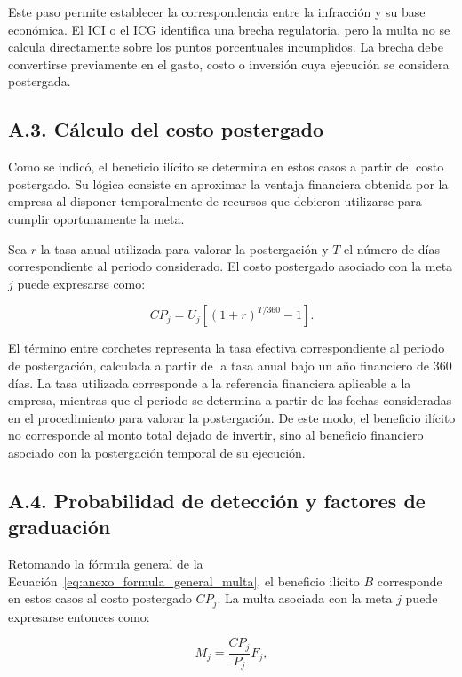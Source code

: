 Este paso permite establecer la correspondencia entre la infracción y su base económica. El ICI o el ICG identifica una brecha regulatoria, pero la multa no se calcula directamente sobre los puntos porcentuales incumplidos. La brecha debe convertirse previamente en el gasto, costo o inversión cuya ejecución se considera postergada.

\subsection*{A.3. Cálculo del costo postergado}

Como se indicó, el beneficio ilícito se determina en estos casos a partir del costo postergado. Su lógica consiste en aproximar la ventaja financiera obtenida por la empresa al disponer temporalmente de recursos que debieron utilizarse para cumplir oportunamente la meta.

Sea \(r\) la tasa anual utilizada para valorar la postergación y \(T\) el número de días correspondiente al periodo considerado. El costo postergado asociado con la meta \(j\) puede expresarse como:

\begin{equation}
\label{eq:anexo_costo_postergado}
CP_j
=
U_j
\left[
(1+r)^{T/360}-1
\right].
\end{equation}

El término entre corchetes representa la tasa efectiva correspondiente al periodo de postergación, calculada a partir de la tasa anual bajo un año financiero de 360 días. La tasa utilizada corresponde a la referencia financiera aplicable a la empresa, mientras que el periodo se determina a partir de las fechas consideradas en el procedimiento para valorar la postergación. De este modo, el beneficio ilícito no corresponde al monto total dejado de invertir, sino al beneficio financiero asociado con la postergación temporal de su ejecución.

\subsection*{A.4. Probabilidad de detección y factores de graduación}

Retomando la fórmula general de la Ecuación~\eqref{eq:anexo_formula_general_multa}, el beneficio ilícito \(B\) corresponde en estos casos al costo postergado \(CP_j\). La multa asociada con la meta \(j\) puede expresarse entonces como:

\begin{equation}
\label{eq:anexo_multa_meta}
M_j
=
\frac{CP_j}{P_j}
F_j,
\end{equation}

